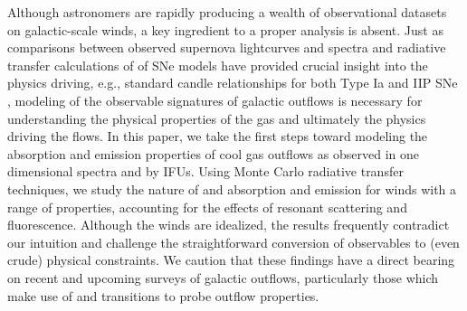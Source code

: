 \documentclass[12pt,preprint]{aastex}
\begin{document}

Although astronomers are rapidly producing a wealth of observational
datasets on galactic-scale winds, a key ingredient to a proper
analysis is absent.  Just as comparisons between observed supernova 
lightcurves and spectra and radiative transfer calculations of
of SNe models have provided crucial insight into the physics driving,
e.g., standard candle relationships for both Type Ia and IIP SNe 
\citep{kw07,kw09}, modeling of the observable signatures of galactic
outflows is necessary for understanding the physical
properties of the gas and ultimately the physics driving the flows. 
In this paper, we take the first steps toward modeling the absorption
and emission properties of cool gas outflows as observed in one
dimensional spectra and by IFUs.  Using Monte Carlo
radiative transfer techniques, we study the nature of  and
 absorption and emission for winds with a range of
properties, accounting for the effects of resonant scattering and
fluorescence. 
Although the winds are idealized, the results frequently
contradict our intuition and 
challenge the straightforward conversion of observables to (even crude) physical
constraints.  We caution that these findings have a direct bearing on
recent and upcoming surveys of galactic outflows, particularly those
which make use of  and  transitions to probe
outflow properties.
\end{document}
